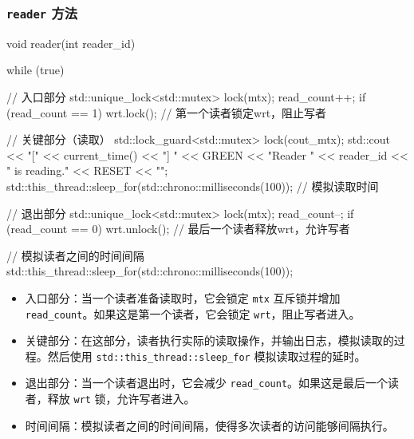 \subsubsection{\texttt{reader} 方法}
\begin{cppcode}
void reader(int reader_id)
{
    while (true) {
        // 入口部分
        {
            std::unique_lock<std::mutex> lock(mtx);
            read_count++;
            if (read_count == 1) {
                wrt.lock(); // 第一个读者锁定wrt，阻止写者
            }
        }

        // 关键部分（读取）
        {
            std::lock_guard<std::mutex> lock(cout_mtx);
            std::cout << "[" << current_time() << "] "
                      << GREEN << "Reader " << reader_id << " is reading." << RESET << "\n";
        }
        std::this_thread::sleep_for(std::chrono::milliseconds(100)); // 模拟读取时间

        // 退出部分
        {
            std::unique_lock<std::mutex> lock(mtx);
            read_count--;
            if (read_count == 0) {
                wrt.unlock(); // 最后一个读者释放wrt，允许写者
            }
        }

        // 模拟读者之间的时间间隔
        std::this_thread::sleep_for(std::chrono::milliseconds(100));
    }
}
\end{cppcode}
\begin{itemize}
    \item 入口部分：当一个读者准备读取时，它会锁定 \texttt{mtx} 互斥锁并增加 \texttt{read\_count}。如果这是第一个读者，它会锁定 \texttt{wrt}，阻止写者进入。
    \item 关键部分：在这部分，读者执行实际的读取操作，并输出日志，模拟读取的过程。然后使用 \texttt{std::this\_thread::sleep\_for} 模拟读取过程的延时。
    \item 退出部分：当一个读者退出时，它会减少 \texttt{read\_count}。如果这是最后一个读者，释放 \texttt{wrt} 锁，允许写者进入。
    \item 时间间隔：模拟读者之间的时间间隔，使得多次读者的访问能够间隔执行。
\end{itemize}
 
